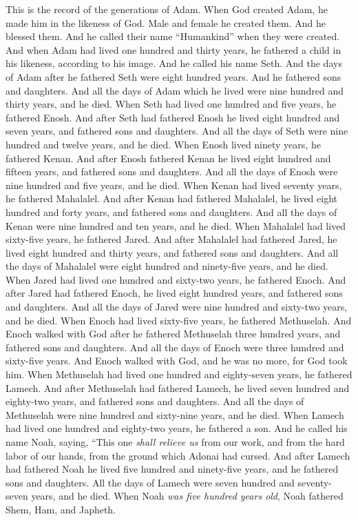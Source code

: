 \begin{biblechapter} %
 This is the record of the generations of Adam. When God created Adam, he made him in the likeness of God.
\verse Male and female he created them. And he blessed them. And he called their name “Humankind” when they were created.
\verse And when Adam had lived one hundred and thirty years, he fathered a child in his likeness, according to his image. And he called his name Seth.
\verse And the days of Adam after he fathered Seth were eight hundred years. And he fathered sons and daughters.
\verse And all the days of Adam which he lived were nine hundred and thirty years, and he died.
\verse When Seth had lived one hundred and five years, he fathered Enosh.
\verse And after Seth had fathered Enosh he lived eight hundred and seven years, and fathered sons and daughters.
\verse And all the days of Seth were nine hundred and twelve years, and he died.
\verse When Enosh lived ninety years, he fathered Kenan.
\verse And after Enosh fathered Kenan he lived eight hundred and fifteen years, and fathered sons and daughters.
\verse And all the days of Enosh were nine hundred and five years, and he died.
\verse When Kenan had lived seventy years, he fathered Mahalalel.
\verse And after Kenan had fathered Mahalalel, he lived eight hundred and forty years, and fathered sons and daughters.
\verse And all the days of Kenan were nine hundred and ten years, and he died.
\verse When Mahalalel had lived sixty-five years, he fathered Jared.
\verse And after Mahalalel had fathered Jared, he lived eight hundred and thirty years, and fathered sons and daughters.
\verse And all the days of Mahalalel were eight hundred and ninety-five years, and he died.
\verse When Jared had lived one hundred and sixty-two years, he fathered Enoch.
\verse And after Jared had fathered Enoch, he lived eight hundred years, and fathered sons and daughters.
\verse And all the days of Jared were nine hundred and sixty-two years, and he died.
\verse When Enoch had lived sixty-five years, he fathered Methuselah.
\verse And Enoch walked with God after he fathered Methuselah three hundred years, and fathered sons and daughters.
\verse And all the days of Enoch were three hundred and sixty-five years.
\verse And Enoch walked with God, and he was no more, for God took him.
\verse When Methuselah had lived one hundred and eighty-seven years, he fathered Lamech.
\verse And after Methuselah had fathered Lamech, he lived seven hundred and eighty-two years, and fathered sons and daughters.
\verse And all the days of Methuselah were nine hundred and sixty-nine years, and he died.
\verse When Lamech had lived one hundred and eighty-two years, he fathered a son.
\verse And he called his name Noah, saying, “This one \textit{shall relieve us} from our work, and from the hard labor of our hands, from the ground which Adonai had cursed.
\verse And after Lamech had fathered Noah he lived five hundred and ninety-five years, and he fathered sons and daughters.
\verse All the days of Lamech were seven hundred and seventy-seven years, and he died.
\verse When Noah \textit{was five hundred years old}, Noah fathered Shem, Ham, and Japheth.
\end{biblechapter}

